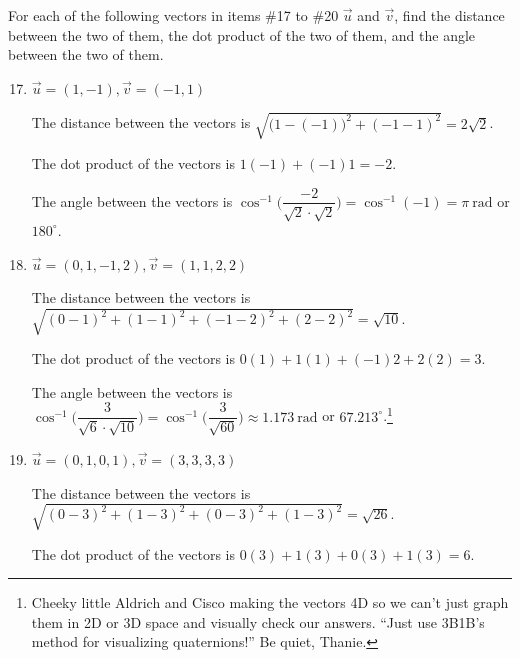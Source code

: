\documentclass{article}
\begin{document}
\pagebreak
\begin{center}
    \colorbox{CornflowerBlue!50}{
    \begin{minipage}[c]{0.9\textwidth}
        \centering
        For each of the following vectors in items \#17 to \#20 \(\overrightarrow{u}\) and \(\overrightarrow{v}\), find the distance between the two of them, the dot product of the two of them, and the angle between the two of them. 
    \end{minipage}
    }
\end{center}
\begin{enumerate}
    \setcounter{enumi}{16}
    \item \(\overrightarrow{u} = (1,-1), \overrightarrow{v} = (-1,1)\)\begin{solution}
        The distance between the vectors is \(\sqrt{{\bigl(1-(-1)\bigr)}^2 + {(-1 -1)}^2} = 2\sqrt{2}\).\par
        The dot product of the vectors is \(1(-1) + (-1)1 = -2\).\par 
        The angle between the vectors is \(\cos^{-1} \biggl(\dfrac{-2}{\sqrt{2}\cdot\sqrt{2}}\biggr) = \cos^{-1} (-1) = \pi~\text{rad}\) or \(180^{\circ}\). 
    \end{solution}
    \item \(\overrightarrow{u} = (0,1,-1,2), \overrightarrow{v} = (1,1,2,2)\)\begin{solution}
        The distance between the vectors is \(\sqrt{{(0-1)}^2 + {(1 -1)}^2 + {(-1 -2)}^2 + {(2 -2)}^2} = \sqrt{10}\).\par
        The dot product of the vectors is \(0(1) + 1(1) + (-1)2 + 2(2) = 3\).\par 
        The angle between the vectors is \(\cos^{-1} \biggl(\dfrac{3}{\sqrt{6}\cdot\sqrt{10}}\biggr) = \cos^{-1} \biggl(\dfrac{3}{\sqrt{60}}\biggr) \approx 1.173~\text{rad}\) or \(67.213^{\circ}\).\footnote{Cheeky little Aldrich and Cisco making the vectors 4D so we can't
        just graph them in 2D or 3D space and visually check our answers. ``Just use 3B1B's method for visualizing quaternions!'' Be quiet, Thanie.} 
    \end{solution}
    \item \(\overrightarrow{u} = (0,1,0,1), \overrightarrow{v} = (3,3,3,3)\)\begin{solution}
        The distance between the vectors is \(\sqrt{{(0-3)}^2 + {(1 -3)}^2 + {(0 -3)}^2 + {(1 -3)}^2} = \sqrt{26}\).\par
        The dot product of the vectors is \(0(3) + 1(3) + 0(3) + 1(3) = 6\).\par 

\end{solution}
\end{enumerate}
\end{document}
